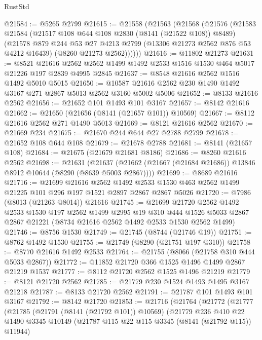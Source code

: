 \begin{lexlean}{RustStd}
\begin{coremodule}
@21584 := @5265 @2799
@21615 := @21558
    (@21563
      (@21568
        (@21576
          (@21583
            @21584
            (@21517 @108 @644 @108 @2830 (@8141 (@21522 @108)) @8489)
            (@21578
              @879
              @244
              @53
              @27
              @4213
              @2799
              (@13306 @21273 @2562 @876 @53 @4212 @16439)
              (@8260 @21273 @2562))))))
@21616 := @11802 @21273
@21631 := @8521
    @21616
    @2562
    @2562
    @1499
    @1492
    @2533
    @1516
    @1530
    @464
    @5017
    @21226
    @197
    @2839
    @4995
    @2845
@21637 := @8548 @21616 @2562 @1516 @1492 @5010 @5015
@21650 := @10587 @21616 @2562 @230 @1490 @1492 @3167 @271 @2867 @5013 @2562 @3160 @5002 @5006
@21652 := @8133 @21616 @2562
@21656 := @21652 @101 @1493 @101 @3167
@21657 := @8142 @21616
@21662 := @21650 (@21656 (@8141 (@21657 @101)) @10569)
@21667 := @8112 @21616 @2562 @271 @1490 @5013
@21669 := @8121 @21616 @2562
@21670 := @21669 @234
@21675 := @21670 @244 @644 @27 @2788 @2799
@21678 := @21652 @108 @644 @108
@21679 := @21678 @2788
@21681 := @8141 (@21657 @108)
@21684 := @21675 (@21679 @21681 @8186)
@21686 := @8260 @21616 @2562
@21698 := @21631
    (@21637 (@21662 (@21667 (@21684 @21686)) @13846 @8912 @10644 (@8290 (@8639 @5003 @2867))))
@21699 := @8689 @21616
@21716 := @21699
    @21616
    @2562
    @1492
    @2533
    @1530
    @463
    @2562
    @1499
    @21225
    @101
    @296
    @197
    @1521
    @2897
    @2867
    @2867
    @5026
@21720 := @7986 (@8013 (@21263 @8014)) @21616
@21745 := @21699
    @21720
    @2562
    @1492
    @2533
    @1530
    @197
    @2562
    @1499
    @2995
    @19
    @310
    @444
    @1526
    @5033
    @2867
    @2867
    @21221
    (@8734 @21616 @2562 @1492 @2533 @1530 @2562 @1499)
@21746 := @8756 @1530
@21749 := @21745 (@8744 (@21746 @19))
@21751 := @8762 @1492 @1530
@21755 := @21749 (@8290 (@21751 @197 @310))
@21758 := @8770 @21616 @1492 @2533
@21764 := @21755 (@8066 (@21758 @310 @444 @5033 @2867))
@21772 := @11852 @21720 @366 @1525 @1496 @1499 @2867 @21219 @1537
@21777 := @8112 @21720 @2562 @1525 @1496 @21219
@21779 := @8121 @21720 @2562
@21785 := @21779 @230 @1524 @1493 @1495 @3167 @21218
@21787 := @8133 @21720 @2562
@21791 := @21787 @101 @1493 @101 @3167
@21792 := @8142 @21720
@21853 := @21716
    (@21764
      (@21772
        (@21777
          (@21785
            (@21791 (@8141 (@21792 @101)) @10569)
            (@21779
              @236
              @410
              @22
              @1490
              @3345
              @10149
              (@21787 @115 @22 @115 @3345 (@8141 (@21792 @115)) @11944)

\end{coremodule}
\end{lexlean}
